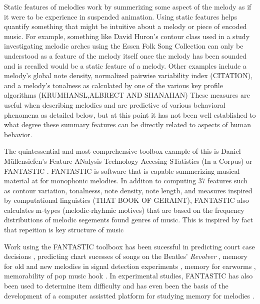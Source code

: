 \documentclass[]{book}
\begin{document}
Static features of melodies work by summerizing some aspect of the melody as if it were to be experience in suspended animation.
Using static features helps quantify something that might be intuitive about a melody or piece of encoded music.
For example, something like David Huron's contour class used in a study investigating melodic arches \citep{huronMelodicArchWestern1996} using the Essen Folk Song Collection \citep{schaffrathEssenFolkSong1995} can only be understood as a feature of the melody itself once the melody has been sounded and is recalled would be a static feature of a melody.
Other examples include a melody's global note density, normalized pairwise variability index (CITATION), and a melody's tonalness as calculated by one of the various key profile algorithms (KRUMHANSL,ALBRECT AND SHANAHAN)
These measures are useful when describing melodies and are predictive of various behavioral phenomena as detailed below, but at this point it has not been well established to what degree these summary features can be directly related to aspects of human behavior.

The quintessential and most comprehensive toolbox example of this is Daniel Müllensiefen's Feature ANalysis Technology Accesing STatistics (In a Corpus) or FANTASTIC \citep{mullensiefenFantasticFeatureANalysis2009}.
FANTASTIC is software that is capable summerizing musical material at for monophonic melodies.
In additon to computing 37 features such as contour variation, tonalnesss, note density, note length, and measures inspired by computational linguistics (THAT BOOK OF GERAINT), FANTASTIC also calculates m-types (melodic-rhyhmic motives) that are based on the frequency distributions of melodic segements found genres of music.
This is inspired by fact that repeition is key structure of music \citep{huronSweetAnticipation2006}

Work using the FANTASTIC toolboox has been sucessful in predicting court case decisions \citep{mullensiefenCourtDecisionsMusic2009}, predicting chart sucesses of songs on the Beatles' \emph{Revolver} \citep{kopiezAufSucheNach2011}, memory for old and new melodies in signal detection experiments \citep{mullensiefenRoleFeaturesContext2014}, memory for earworms \citep{jakubowskiDissectingEarwormMelodic2017, williamsonEarwormsThreeAngles2012}, memorability of pop music hook \citep{balenCorpusAnalyisTools2015}.
In experimental studies, FANTASTIC has also been used to determine item difficulty \citep{bakerPerceptionLeitmotivesRichard2017, harrisonModellingMelodicDiscrimination2016} and has even been the basis of the development of a computer assistted platform for studying memory for melodies \citep{rainsfordMUSOSMUsicSOftware2018}.
\end{document}
